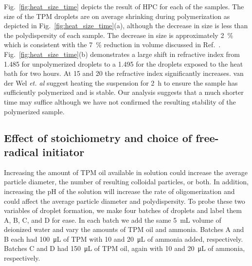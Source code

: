 Fig.~\ref{fig:heat_size_time} depicts the result of HPC for each
of the samples. The size of the TPM droplets are on average shrinking
during polymerization as depicted in Fig.~\ref{fig:heat_size_time}(a),
although the decrease in size is less than the polydispersity of each sample.
The decrease in size is approximately \SI{2}{\percent} which is consistent
with the \SI{7}{\percent} reduction in volume discussed in Ref.~\cite{vanderwel17}.
Fig.~\ref{fig:heat_size_time}(b) demonstrates a large shift in refractive index
from \SI{1.485}{} for unpolymerized droplets to a \SI{1.495}{} for the droplets
exposed to the heat bath for two hours.
At \num{15} and \SI{20}{\min} the refractive index significantly increases.
van der Wel \emph{et. al} \cite{vanderwel17} suggest heating the suspension
for \SI{2}{\hour} to ensure the sample has sufficiently polymerized and is
stable. Our analysis suggests that a much shorter time may suffice although
we have not confirmed the resulting stability of the polymerized sample.

\subsection{Effect of stoichiometry and choice of free-radical initiator}

Increasing the amount of TPM oil available in solution could increase the
average particle diameter, the number of resulting colloidal particles, or both.
In addition, increasing the pH of the solution will increase the rate of
oligomerization and could affect the average particle diameter and polydispersity.
To probe these two variables of droplet formation, we make four batches of droplets
and label them A, B, C, and D for ease.
In each batch we add the same \SI{5}{\milli \liter} volume of deionized water
and vary the amounts of TPM oil and ammonia. Batches A and B each had 
\SI{100}{\micro\liter} of TPM with \si{10} and \SI{20}{\micro\liter} of 
ammonia added, respectively. Batches C and D had \SI{150}{\micro\liter} of TPM oil, 
again with \si{10} and \SI{20}{\micro\liter} of ammonia, respectively. 


